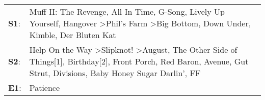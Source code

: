 \begin{supertabular}{p{0.03\textwidth}p{0.92\textwidth}}
 \textbf{S1}:  &                                                                                    Muff II: The Revenge\textsuperscript{}, \enspace All In Time\textsuperscript{}, \enspace G-Song\textsuperscript{}, \enspace Lively Up Yourself\textsuperscript{}, \enspace Hangover\textsuperscript{} \textgreater \enspace Phil's Farm\textsuperscript{} \textgreater \enspace Big Bottom\textsuperscript{}, \enspace Down Under\textsuperscript{}, \enspace Kimble\textsuperscript{}, \enspace Der Bluten Kat\textsuperscript{}  \enspace  \\
 \textbf{S2}:  &  Help On the Way\textsuperscript{} \textgreater \enspace Slipknot!\textsuperscript{} \textgreater \enspace August\textsuperscript{}, \enspace The Other Side of Things[1]\textsuperscript{}, \enspace Birthday[2]\textsuperscript{}, \enspace Front Porch\textsuperscript{}, \enspace Red Baron\textsuperscript{}, \enspace Avenue\textsuperscript{}, \enspace Gut Strut\textsuperscript{}, \enspace Divisions\textsuperscript{}, \enspace Baby Honey Sugar Darlin'\textsuperscript{}, \enspace FF\textsuperscript{}  \enspace  \\
 \textbf{E1}:  &                                                                                                                                                                                                                                                                                                                                                                                                                                                                                           Patience\textsuperscript{}  \enspace  \\
\end{supertabular}
